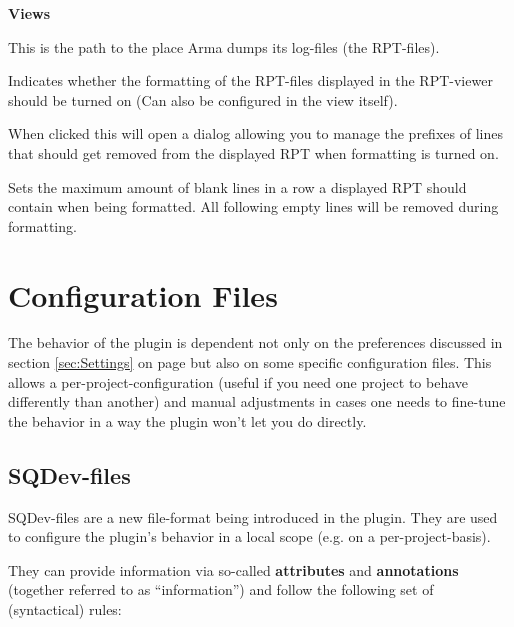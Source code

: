 \documentclass[twoside=false]{scrbook}
\newcommand{\SQDev}{SQDev\xspace}
\newcommand{\arma}{Arma\xspace}
\newenvironment{options*}{%
	\vspace{3mm}%
	\hrule{}

	\newcommand{\option}[1]{%
		\item \textbf{##1} - \hspace{-1.6mm}%
	}%
	\begin{itemize}%
}{%
	\end{itemize}\hrule%
	\vspace{3mm}%
}
\newenvironment{options}[1][Options]{%
	\needspace{2\baselineskip}
	\textbf{#1}%
	\begin{options*}%
}{%
	\end{options*}%
}
\begin{document}
	\vspace{1.5cm}
	
	\begin{options}[Views]
		 This is the path to the place \arma dumps its log-files (the RPT-files).
		
		 Indicates whether the formatting of the RPT-files displayed in the RPT-viewer should be turned on (Can also be configured in the view itself).
		
		 When clicked this will open a dialog allowing you to manage the prefixes of lines that should get removed from the displayed RPT when formatting is turned on.
		
		 Sets the maximum amount of blank lines in a row a displayed RPT should contain when being formatted. All following empty lines will be removed during formatting.
	\end{options}
	
	
	\section{Configuration Files}
	\label{sec:ConfigurationFiles}
	The behavior of the plugin is dependent not only on the preferences discussed in section \ref{sec:Settings} on page \pageref{sec:Settings} but also on some specific configuration files. This allows a per-project-configuration (useful if you need one project to behave differently than another) and manual adjustments in cases one needs to fine-tune the behavior in a way the plugin won't let you do directly.
	
	\subsection{\SQDev-files}
	\label{ssec:SQDevFiles}
	\SQDev-files are a new file-format being introduced in the plugin. They are used to configure the plugin's behavior in a local scope (e.g. on a per-project-basis).
	
	They can provide information via so-called \textbf{attributes} and \textbf{annotations} (together referred to as “information”) and follow the following set of (syntactical) rules:
	
\end{document}
